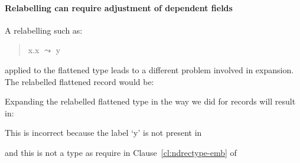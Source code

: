 

\paragraph{Relabelling can require adjustment of dependent fields}
A relabelling such as:
\begin{quote}
x.x $\leadsto$ y
\end{quote}
applied to the flattened type leads to a different problem involved in
expansion.  
The relabelled flattened record would be:
\begin{quote}
\end{quote}
Expanding the relabelled flattened type in the way we did for records will result in:
\begin{quote}
\end{quote}
This is incorrect because the label `y' is not present in 
\begin{quote}
\end{quote}
and this is not a type as require in Clause~\ref{cl:ndrectype-emb} of
